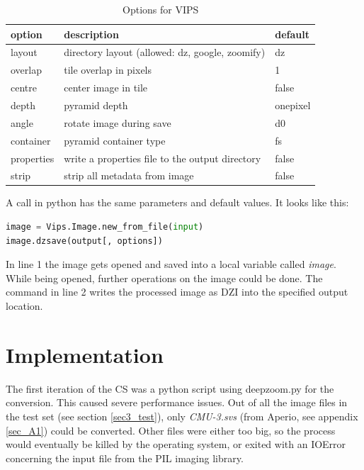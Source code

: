\begin{table}[H]
	\begin{center}
		\begin{tabular}{| l | l | l |}
			\hline
			\textbf{option} & \textbf{description} & \textbf{default} \\ \hline
			layout & directory layout (allowed: dz, google, zoomify) & dz \\ \hline
			overlap & tile overlap in pixels & 1 \\ \hline
			centre & center image in tile & false \\ \hline
			depth & pyramid depth & onepixel \\ \hline
			angle & rotate image during save & d0 \\ \hline
			container & pyramid container type & fs \\ \hline
			properties & write a properties file to the output directory & false \\ \hline
			strip & strip all metadata from image & false \\ \hline
		\end{tabular}
		\caption{Options for VIPS}
		\label{tab3_optionsVips}
	\end{center}
\end{table}

A call in python has the same parameters and default values. It looks like this:

\begin{lstlisting}[frame=single, language=python]
image = Vips.Image.new_from_file(input)
image.dzsave(output[, options])
\end{lstlisting}

In line 1 the image gets opened and saved into a local variable called \emph{image}. While being opened, further operations on the image could be done. The command in line 2 writes the processed image as DZI into the specified output location.


\section{Implementation}
The first iteration of the CS was a python script using deepzoom.py for the conversion. This caused severe performance issues. Out of all the image files in the test set (see section \ref{sec3_test}), only \emph{CMU-3.svs} (from Aperio, see appendix \ref{sec_A1}) could be converted. Other files were either too big, so the process would eventually be killed by the operating system, or exited with an IOError concerning the input file from the PIL imaging library.

